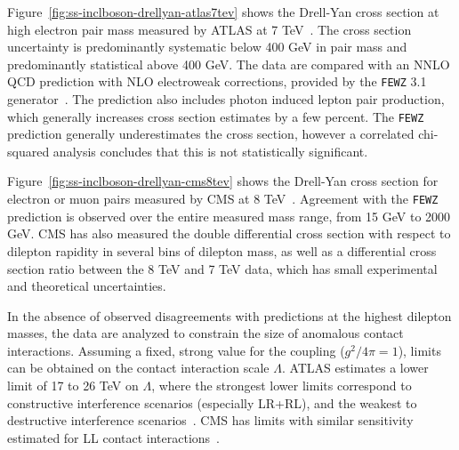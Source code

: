 Figure~\ref{fig:ss-inclboson-drellyan-atlas7tev} shows the Drell-Yan
cross section at high electron pair mass measured by ATLAS at 7
TeV~\cite{Aad:2013iua}.  The cross section uncertainty is
predominantly systematic below 400 GeV in pair mass and predominantly
statistical above 400 GeV.  The data are compared with an NNLO QCD
prediction with NLO electroweak corrections, provided by the
\texttt{FEWZ} 3.1
generator~\cite{Melnikov:2006kv,Gavin:2010az,Li:2012wna}.  The
prediction also includes photon induced lepton pair production, which
generally increases cross section estimates by a few percent. The
\texttt{FEWZ} prediction generally underestimates the cross section,
however a correlated chi-squared analysis concludes that this is not
statistically significant.

Figure~\ref{fig:ss-inclboson-drellyan-cms8tev} shows the Drell-Yan
cross section for electron or muon pairs measured by CMS at 8
TeV~\cite{CMS:2014jea}.  Agreement with the \texttt{FEWZ} prediction
is observed over the entire measured mass range, from 15 GeV to 2000
GeV.  CMS has also measured the double differential cross section with
respect to dilepton rapidity in several bins of dilepton mass, as well
as a differential cross section ratio between the 8 TeV and 7 TeV
data, which has small experimental and theoretical uncertainties.

In the absence of observed disagreements with predictions at the
highest dilepton masses, the data are analyzed to constrain the size
of anomalous contact interactions. Assuming a fixed, strong value for
the coupling ($g^2/4\pi = 1$), limits can be obtained on the contact
interaction scale $\Lambda$.  ATLAS estimates a lower limit of 17 to
26 TeV on $\Lambda$, where the strongest lower limits correspond to
constructive interference scenarios (especially LR+RL), and the
weakest to destructive interference scenarios~\cite{Aad:2014wca}.  CMS
has limits with similar sensitivity estimated for LL contact
interactions~\cite{Khachatryan:2014fba}.


